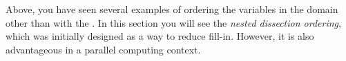 
Above, you have seen several examples of ordering the variables in the
domain other than with the . In this
section you will see the \emph{nested dissection ordering}, which was
initially designed as a way to reduce fill-in. However, it is also
advantageous in a parallel computing context.

